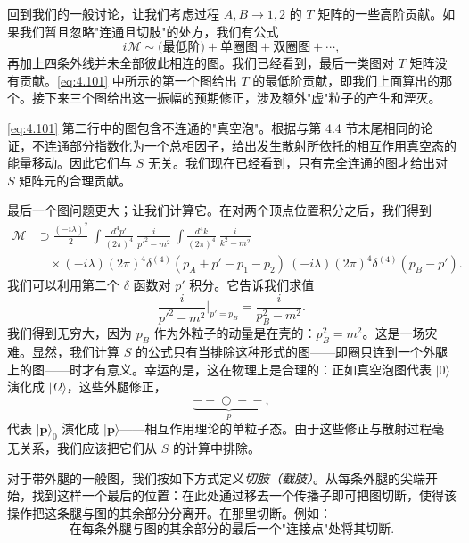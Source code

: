 回到我们的一般讨论，让我们考虑过程 $A, B \to 1, 2$ 的 $T$ 矩阵的一些高阶贡献。如果我们暂且忽略"连通且切肢"的处方，我们有公式
\begin{equation}
  i\mathcal{M} \sim \text{(最低阶)} + \text{单圈图}
    + \text{双圈图} + \cdots ,
  \label{eq:4.101}
\end{equation}
再加上四条外线并未全部彼此相连的图。我们已经看到，最后一类图对 $T$ 矩阵没有贡献。\eqref{eq:4.101} 中所示的第一个图给出 $T$ 的最低阶贡献，即我们上面算出的那个。接下来三个图给出这一振幅的预期修正，涉及额外"虚"粒子的产生和湮灭。

\eqref{eq:4.101} 第二行中的图包含不连通的"真空泡"。根据与第 4.4 节末尾相同的论证，不连通部分指数化为一个总相因子，给出发生散射所依托的相互作用真空态的能量移动。因此它们与 $S$ 无关。我们现在已经看到，只有完全连通的图才给出对 $S$ 矩阵元的合理贡献。

最后一个图问题更大；让我们计算它。在对两个顶点位置积分之后，我们得到
\begin{equation}
  \begin{aligned}
    \mathcal{M} &\supset \frac{(-i\lambda)^2}{2}\
      \int \frac{d^4p'}{(2\pi)^4}\ \frac{i}{p'^2-m^2}\
      \int \frac{d^4k}{(2\pi)^4}\ \frac{i}{k^2-m^2}\\
    &\quad \times (-i\lambda)(2\pi)^4\delta^{(4)}(p_A+p'-p_1-p_2)\
      (-i\lambda)(2\pi)^4\delta^{(4)}(p_B-p') .
  \end{aligned}
  \label{eq:4.102}
\end{equation}
我们可以利用第二个 $\delta$ 函数对 $p'$ 积分。它告诉我们求值
\begin{equation}
  \frac{i}{p'^2-m^2}\Big|_{p'=p_B} = \frac{i}{p_B^2-m^2} .
\end{equation}
我们得到无穷大，因为 $p_B$ 作为外粒子的动量是在壳的：$p_B^2 = m^2$。这是一场灾难。显然，我们计算 $S$ 的公式只有当排除这种形式的图——即圈只连到一个外腿上的图——时才有意义。幸运的是，这在物理上是合理的：正如真空泡图代表 $|0\rangle$ 演化成 $|\Omega\rangle$，这些外腿修正，
\begin{equation}
  \underbrace{-\!-\!\bigcirc\!-\!-}_{p},
\end{equation}
代表 $|\mathbf{p}\rangle_0$ 演化成 $|\mathbf{p}\rangle$——相互作用理论的单粒子态。由于这些修正与散射过程毫无关系，我们应该把它们从 $S$ 的计算中排除。

对于带外腿的一般图，我们按如下方式定义\emph{切肢（截肢）}。从每条外腿的尖端开始，找到这样一个最后的位置：在此处通过移去一个传播子即可把图切断，使得该操作把这条腿与图的其余部分分离开。在那里切断。例如：
\begin{equation}
  \text{在每条外腿与图的其余部分的最后一个"连接点"处将其切断} .
\end{equation}

